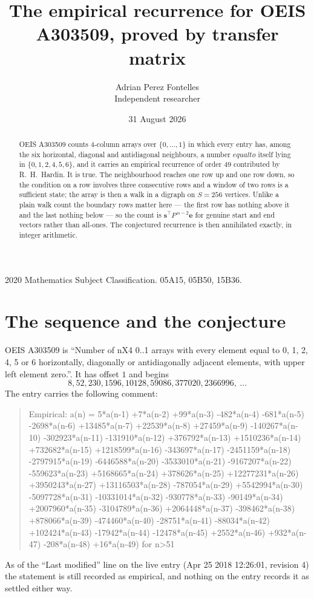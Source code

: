 \documentclass[11pt,a4paper]{article}
\title{The empirical recurrence for OEIS A303509, proved by transfer matrix}
\author{Adrian Perez Fontelles\\ \small Independent researcher}
\date{31 August 2026}
\theoremstyle{plain}
\theoremstyle{definition}
\begin{document}
\maketitle

\begin{abstract}
OEIS A303509 counts $4$-column arrays over $\{0,\dots,1\}$ in which every entry has,
among the six horizontal, diagonal and antidiagonal neighbours, a number $equal to$ itself lying in $\{0,1,2,4,5,6\}$, and it carries an empirical
recurrence of order $49$ contributed by R.~H.~Hardin. It is true. The neighbourhood
reaches one row up and one row down, so the condition on a row involves three consecutive
rows and a window of two rows is a sufficient state; the array is then a walk in a digraph
on $S=256$ vertices. Unlike a plain walk count the boundary rows matter here --- the first
row has nothing above it and the last nothing below --- so the count is
$\mathbf{s}^{\!\top}P^{\,n-2}\mathbf{e}$ for genuine start and end vectors rather than
all-ones. The conjectured recurrence is then annihilated exactly, in integer arithmetic.
\end{abstract}

\noindent\small 2020 Mathematics Subject Classification. 05A15, 05B50, 15B36.\normalsize

\section{The sequence and the conjecture}

OEIS A303509 is ``Number of nX4 0..1 arrays with every element equal to 0, 1, 2, 4, 5 or 6 horizontally, diagonally or antidiagonally adjacent elements, with upper left element zero.''. It has offset
$1$ and begins
\[
8, 52, 230, 1596, 10128, 59086, 377020, 2366996,\ \dots
\]
The entry carries the following comment:
\begin{quote}\small
Empirical: a(n) = 5*a(n-1) +7*a(n-2) +99*a(n-3) -482*a(n-4) -681*a(n-5) -2698*a(n-6) +13485*a(n-7) +22539*a(n-8) +27459*a(n-9) -140267*a(n-10) -302923*a(n-11) -131910*a(n-12) +376792*a(n-13) +1510236*a(n-14) +732682*a(n-15) +1218599*a(n-16) -343697*a(n-17) -2451159*a(n-18) -2797915*a(n-19) -6446588*a(n-20) -3533010*a(n-21) -9167207*a(n-22) -559623*a(n-23) +5168665*a(n-24) +378626*a(n-25) +12277231*a(n-26) +3950243*a(n-27) +13116503*a(n-28) -787054*a(n-29) +5542994*a(n-30) -5097728*a(n-31) -10331014*a(n-32) -930778*a(n-33) -90149*a(n-34) +2007960*a(n-35) -3104789*a(n-36) +2064448*a(n-37) -398462*a(n-38) +878066*a(n-39) -474460*a(n-40) -28751*a(n-41) -88034*a(n-42) +102424*a(n-43) -17942*a(n-44) -12478*a(n-45) +2552*a(n-46) +932*a(n-47) -208*a(n-48) +16*a(n-49) for n>51
\end{quote}
As of the ``Last modified'' line on the live entry (Apr 25 2018 12:26:01, revision
4) the statement is still recorded as empirical, and nothing on the entry
records it as settled either way.
\end{document}
